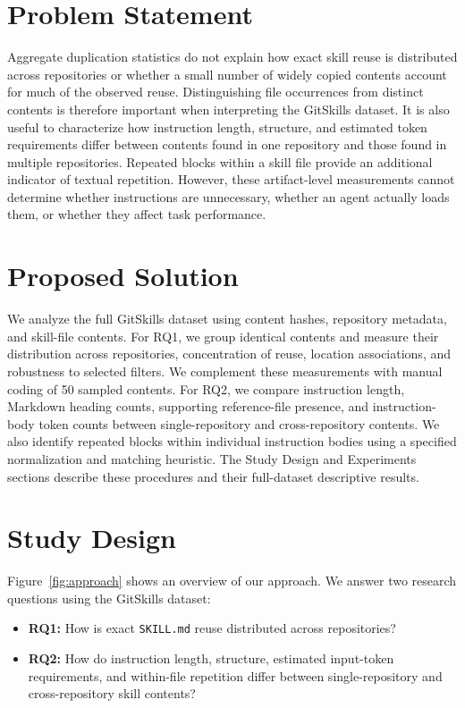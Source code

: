 \documentclass[sigconf,review]{acmart}
\begin{document}
\section{Problem Statement}
\label{Section:Problem}
Aggregate duplication statistics do not explain how exact
skill reuse is distributed across repositories or whether a
small number of widely copied contents account for much of
the observed reuse. Distinguishing file occurrences from
distinct contents is therefore important when interpreting
the GitSkills dataset. It is also useful to characterize how
instruction length, structure, and estimated token requirements
differ between contents found in one repository and those
found in multiple repositories. Repeated blocks within a
skill file provide an additional indicator of textual
repetition. However, these artifact-level measurements cannot
determine whether instructions are unnecessary, whether an
agent actually loads them, or whether they affect task
performance.

\section{Proposed Solution}
\label{Section:Proposed Solution}
We analyze the full GitSkills dataset using content hashes,
repository metadata, and skill-file contents. For RQ1, we
group identical contents and measure their distribution
across repositories, concentration of reuse, location
associations, and robustness to selected filters. We
complement these measurements with manual coding of 50
sampled contents. For RQ2, we compare instruction length,
Markdown heading counts, supporting reference-file presence,
and instruction-body token counts between single-repository
and cross-repository contents. We also identify repeated
blocks within individual instruction bodies using a
specified normalization and matching heuristic. The Study
Design and Experiments sections describe these procedures
and their full-dataset descriptive results.

\section{Study Design}
Figure~\ref{fig:approach} shows an overview of our approach.
We answer two research questions using the GitSkills dataset:
 
\begin{itemize}
  \item \textbf{RQ1:} How is exact \texttt{SKILL.md} reuse distributed across repositories?
  \item \textbf{RQ2:}
    How do instruction length, structure, estimated input-token
    requirements, and within-file repetition differ between
    single-repository and cross-repository skill contents?
\end{itemize}
 
\end{document}
